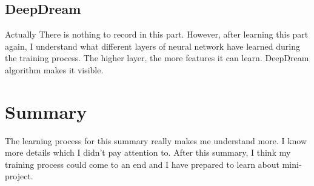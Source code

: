 \documentclass{article}
\begin{document}
\subsection{DeepDream}
Actually There is nothing to record in this part. However, after learning this part again, I understand what different layers of neural network have learned during the training process. The higher layer,  the more features it can learn. DeepDream algorithm makes it visible.

\section{Summary}
The learning process for this summary really makes me understand more. I know more details which I didn't pay attention to. After this summary, I think my training process could come to an end and I have prepared to learn about mini-project.
\end{document}
